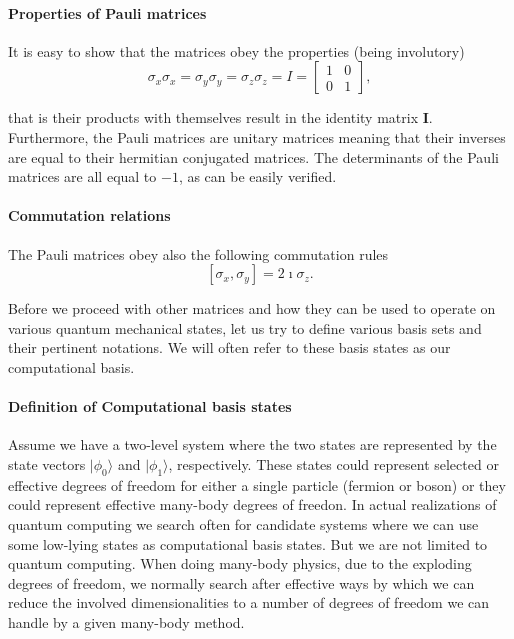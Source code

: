 \paragraph{Properties of Pauli matrices}

It is easy to show that the matrices obey the properties (being involutory)
\[
\sigma_x\sigma_x = \sigma_y\sigma_y=\sigma_z\sigma_z = I=\begin{bmatrix} 1 & 0 \\ 0 & 1\end{bmatrix},
\]

that is their products with themselves result in the identity matrix
$\bm{I}$.  Furthermore, the Pauli matrices are unitary matrices
meaning that their inverses are equal to their hermitian conjugated
matrices. The determinants of the Pauli matrices are all equal to $-1$,
as can be easily verified.


\paragraph{Commutation relations}

The Pauli matrices obey also the following commutation rules
\[
\left[\sigma_x,\sigma_y\right] = 2\imath \sigma_z.
\]

Before we proceed with other matrices and how they can be used to
operate on various quantum mechanical states, let us try to define
various basis sets and their pertinent notations. We will often refer
to these basis states as our computational basis.


\paragraph{Definition of Computational basis states}

Assume we have a two-level system where the two states are represented
by the state vectors $\vert \phi_0\rangle$ and $\vert \phi_1\rangle$,
respectively. These states could represent selected or effective
degrees of freedom for either a single particle (fermion or boson) or
they could represent effective many-body degrees of freedon. In actual
realizations of quantum computing we search often for candidate
systems where we can use some low-lying states as computational basis
states. But we are not limited to quantum computing. When doing
many-body physics, due to the exploding degrees of freedom, we
normally search after effective ways by which we can reduce the
involved dimensionalities to a number of degrees of freedom we can
handle by a given many-body method.


